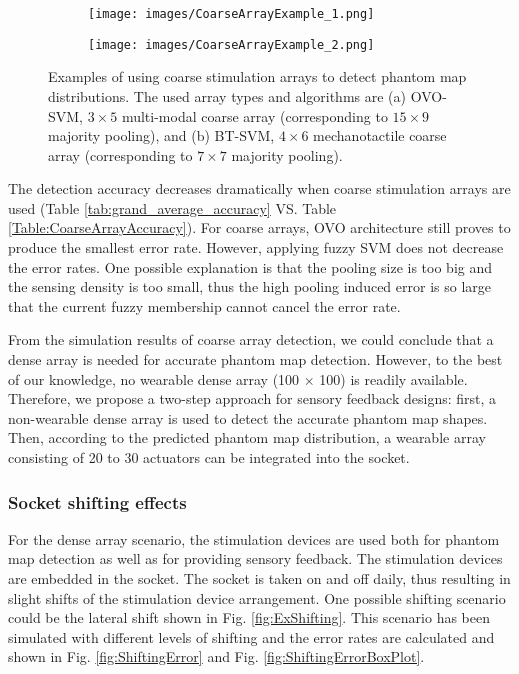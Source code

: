 \begin{figure}[htbp]
    \centering
    \begin{subfigure}[b]{0.43\textwidth}
        \texttt{[image: images/CoarseArrayExample\_1.png]}
        \caption{}
    \end{subfigure}
    \begin{subfigure}[b]{0.43\textwidth}
        \texttt{[image: images/CoarseArrayExample\_2.png]}
        \caption{}
    \end{subfigure}
    \caption{Examples of using coarse stimulation arrays to detect phantom map distributions. The used array types and algorithms are (a) OVO-SVM,  $3\times 5$ multi-modal coarse array (corresponding to $15 \times 9$ majority pooling), and (b) BT-SVM, $4 \times 6$ mechanotactile coarse array (corresponding to $7 \times 7$ majority pooling).  }
    \label{fig:CoarseArrayExample}
\end{figure} 

The detection accuracy decreases dramatically when coarse stimulation arrays are used (Table \ref{tab:grand_average_accuracy} VS. Table \ref{Table:CoarseArrayAccuracy}). For coarse arrays, OVO architecture still proves to produce the smallest error rate. However, applying fuzzy SVM does not decrease the error rates. One possible explanation is that the pooling size is too big and the sensing density is too small, thus the high pooling induced error is so large that the current fuzzy membership cannot cancel the error rate.

From the simulation results of coarse array detection, we could conclude that a dense array is needed for accurate phantom map detection. However, to the best of our knowledge, no wearable dense array (100 $\times$ 100) is readily available. Therefore, we propose a two-step approach for sensory feedback designs: first, a non-wearable dense array is used to detect the accurate phantom map shapes. Then, according to the predicted phantom map distribution, a wearable array consisting of 20 to 30 actuators can be integrated into the socket.
                                 
                                                                                                   
\subsubsection{Socket shifting effects}
For the dense array scenario, the stimulation devices are used both for phantom map detection as well as for providing sensory feedback. The stimulation devices are embedded in the socket. The socket is taken on and off daily, thus resulting in slight shifts of the stimulation device arrangement. One possible shifting scenario could be the lateral shift shown in Fig. \ref{fig:ExShifting}. This scenario has been simulated with different levels of shifting and the error rates are calculated and shown in Fig. \ref{fig:ShiftingError} and Fig. \ref{fig:ShiftingErrorBoxPlot}.

